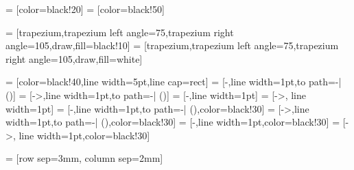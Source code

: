  = [color=black!20]
 = [color=black!50]

\newcommand{\dataRightAngle}{105}%
\newcommand{\dataLeftAngle}{75}%

 = [trapezium,trapezium left angle=\dataLeftAngle,trapezium right angle=\dataRightAngle,draw,fill=black!10]
 = [trapezium,trapezium left angle=\dataLeftAngle,trapezium right angle=\dataRightAngle,draw,fill=white]

 = [color=black!40,line width=5pt,line cap=rect]
 = [-,line width=1pt,to path={-| (\tikztotarget)}]
 = [->,line width=1pt,to path={-| (\tikztotarget)}]
 = [-,line width=1pt]
 = [->, line width=1pt]
 = [-,line width=1pt,to path={-| (\tikztotarget)},color=black!30]
 = [->,line width=1pt,to path={-| (\tikztotarget)},color=black!30]
 = [-,line width=1pt,color=black!30]
 = [->, line width=1pt,color=black!30]

 = [row sep=3mm, column sep=2mm]



\newcommand{\MultilineComponent}[2]
{
	\begin{minipage}{#1}
	\begin{center}
		#2
	\end{center}
	\end{minipage}
}

\newcommand{\TwolineComponent}[3]
{
	\begin{minipage}{#1}
	\begin{center}
		#2 \linebreak #3
	\end{center}
	\end{minipage}
}

\newcommand{\ThreelineComponent}[4]
{
	\begin{minipage}{#1}
	\begin{center}
		#2 \linebreak #3 \linebreak #4
	\end{center}
	\end{minipage}
}

